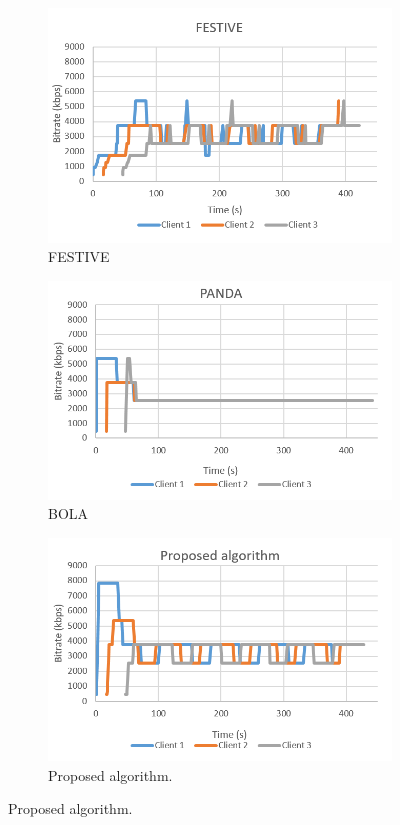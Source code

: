 \documentclass[journal]{IEEEtran}
\begin{document}
\begin{figure}[!h]
\begin{subfigure}[t]{0.3\textwidth}
         \includegraphics[width=\textwidth]{images/Rate_FESTIVE.png}
         \caption{FESTIVE}
         \label{Rate FESTIVE}
     \end{subfigure}
     \begin{subfigure}[t]{0.3\textwidth}
         \centering
         \includegraphics[width=\textwidth]{images/Rate_PANDA.png}
         \caption{BOLA}
         \label{Rate PANDA}
     \end{subfigure}
	\begin{subfigure}[t]{0.3\textwidth}
         \centering
         \includegraphics[width=\textwidth]{images/Rate_proposed.png}
         \caption{Proposed algorithm.}
         \label{Rate pro}
     \end{subfigure}
	

\end{figure}
\end{document}
